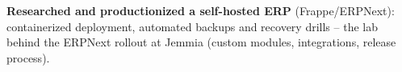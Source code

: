 
\vspace{3pt}
\begin{resume_list}
  \item \textbf{Researched and productionized a self-hosted ERP} (Frappe/ERPNext): containerized deployment, automated backups and recovery drills -- the lab behind the ERPNext rollout at Jemmia (custom modules, integrations, release process).
\end{resume_list}
